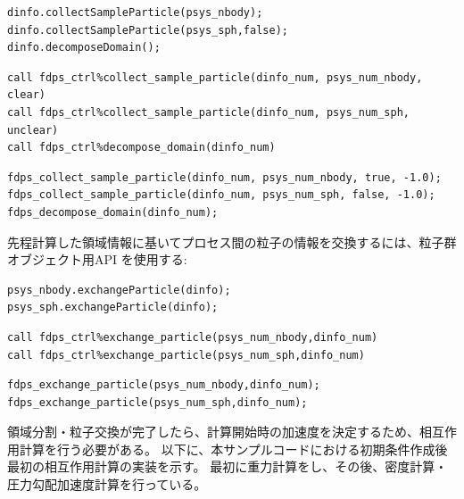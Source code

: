 \ifCpp %
\begin{lstlisting}[caption=領域分割の実行]
dinfo.collectSampleParticle(psys_nbody);
dinfo.collectSampleParticle(psys_sph,false);
dinfo.decomposeDomain();
\end{lstlisting}
\endifCpp
\ifFtn %
\begin{lstlisting}[caption=領域分割の実行]
call fdps_ctrl%collect_sample_particle(dinfo_num, psys_num_nbody, clear)
call fdps_ctrl%collect_sample_particle(dinfo_num, psys_num_sph, unclear)
call fdps_ctrl%decompose_domain(dinfo_num)
\end{lstlisting}
\endifFtn
\ifC %
\begin{lstlisting}[caption=領域分割の実行]
fdps_collect_sample_particle(dinfo_num, psys_num_nbody, true, -1.0);
fdps_collect_sample_particle(dinfo_num, psys_num_sph, false, -1.0);
fdps_decompose_domain(dinfo_num);
\end{lstlisting}
\endifC

先程計算した領域情報に基いてプロセス間の粒子の情報を交換するには、粒子群オブジェクト用API を使用する:

\ifCpp %
\begin{lstlisting}[caption=粒子交換の実行]
psys_nbody.exchangeParticle(dinfo);
psys_sph.exchangeParticle(dinfo);
\end{lstlisting}
\endifCpp
\ifFtn %
\begin{lstlisting}[caption=粒子交換の実行]
call fdps_ctrl%exchange_particle(psys_num_nbody,dinfo_num)
call fdps_ctrl%exchange_particle(psys_num_sph,dinfo_num)
\end{lstlisting}
\endifFtn
\ifC %
\begin{lstlisting}[caption=粒子交換の実行]
fdps_exchange_particle(psys_num_nbody,dinfo_num);
fdps_exchange_particle(psys_num_sph,dinfo_num);
\end{lstlisting}
\endifC


領域分割・粒子交換が完了したら、計算開始時の加速度を決定するため、相互作用計算を行う必要がある。
以下に、本サンプルコードにおける初期条件作成後最初の相互作用計算の実装を示す。
最初に重力計算をし、その後、密度計算・圧力勾配加速度計算を行っている。

